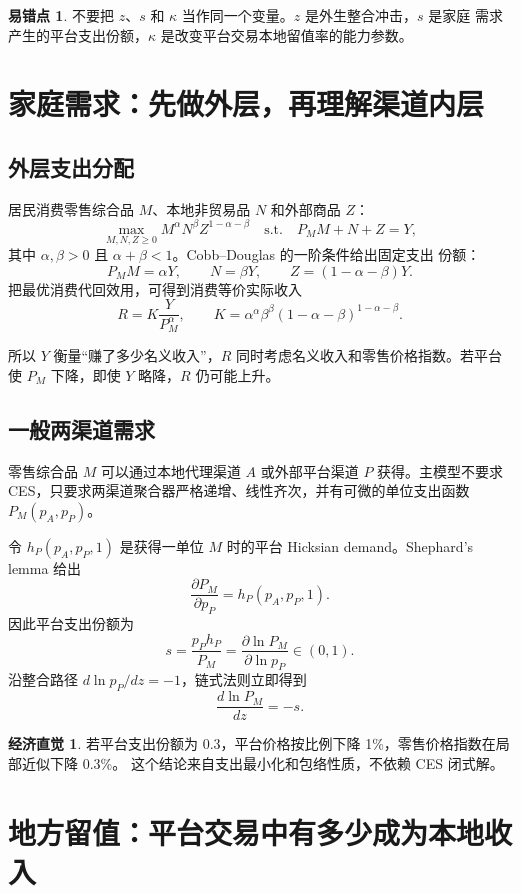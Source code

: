 \documentclass[UTF8,11pt,scheme=chinese,fontset=fandol]{ctexart}
\theoremstyle{definition}
\newtheorem{intuition}{经济直觉}[section]
\newtheorem{commonerror}{易错点}[section]
\begin{document}
\begin{commonerror}
不要把 \(z\)、\(s\) 和 \(\kappa\) 当作同一个变量。\(z\) 是外生整合冲击，\(s\) 是家庭
需求产生的平台支出份额，\(\kappa\) 是改变平台交易本地留值率的能力参数。
\end{commonerror}

\section{家庭需求：先做外层，再理解渠道内层}

\subsection{外层支出分配}

居民消费零售综合品 \(M\)、本地非贸易品 \(N\) 和外部商品 \(Z\)：
\[
\max_{M,N,Z\geq0}M^\alpha N^\beta Z^{1-\alpha-\beta}
\quad\text{s.t.}\quad P_MM+N+Z=Y,
\]
其中 \(\alpha,\beta>0\) 且 \(\alpha+\beta<1\)。Cobb--Douglas 的一阶条件给出固定支出
份额：
\[
P_MM=\alpha Y,
\qquad N=\beta Y,
\qquad Z=(1-\alpha-\beta)Y.
\]
把最优消费代回效用，可得到消费等价实际收入
\[
R=K\frac{Y}{P_M^\alpha},
\qquad
K=\alpha^\alpha\beta^\beta
(1-\alpha-\beta)^{1-\alpha-\beta}.
\]

所以 \(Y\) 衡量“赚了多少名义收入”，\(R\) 同时考虑名义收入和零售价格指数。若平台使
\(P_M\) 下降，即使 \(Y\) 略降，\(R\) 仍可能上升。

\subsection{一般两渠道需求}

零售综合品 \(M\) 可以通过本地代理渠道 \(A\) 或外部平台渠道 \(P\) 获得。主模型不要求
CES，只要求两渠道聚合器严格递增、线性齐次，并有可微的单位支出函数
\(P_M(p_A,p_P)\)。

令 \(h_P(p_A,p_P,1)\) 是获得一单位 \(M\) 时的平台 Hicksian demand。Shephard's lemma
给出
\[
\frac{\partial P_M}{\partial p_P}=h_P(p_A,p_P,1).
\]
因此平台支出份额为
\[
s
=\frac{p_Ph_P}{P_M}
=\frac{\partial\ln P_M}{\partial\ln p_P}
\in(0,1).
\]
沿整合路径 \(d\ln p_P/dz=-1\)，链式法则立即得到
\[
\boxed{\frac{d\ln P_M}{dz}=-s.}
\]

\begin{intuition}
若平台支出份额为 0.3，平台价格按比例下降 1\%，零售价格指数在局部近似下降 0.3\%。
这个结论来自支出最小化和包络性质，不依赖 CES 闭式解。
\end{intuition}

\section{地方留值：平台交易中有多少成为本地收入}
\end{document}
